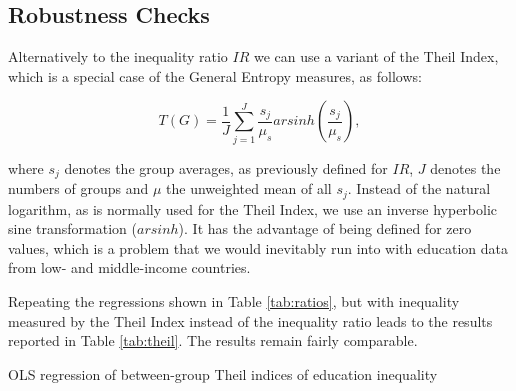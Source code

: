 \begin{appendices}
\clearpage

\hypertarget{robustness-checks-with-the-theil-index}{%
\section{Robustness Checks}\label{robustness-checks-with-the-theil-index}}
\setcounter{table}{0}
\renewcommand{\thetable}{\thesection\arabic{table}}

Alternatively to the inequality ratio \(IR\) we can use a variant of the Theil Index, which is a special case of the General Entropy measures, as follows:

\[
T(G) = \frac{1}{J}\sum_{j=1}^{J}\frac{s_j}{\mu_s}arsinh(\frac{s_j}{\mu_s}),
\]

where \(s_j\) denotes the group averages, as previously defined for \(IR\), \(J\) denotes the numbers of groups and \(\mu\) the unweighted mean of all \(s_j\). Instead of the natural logarithm, as is normally used for the Theil Index, we use an inverse hyperbolic sine transformation (\(arsinh\)). It has the advantage of being defined for zero values, which is a problem that we would inevitably run into with education data from low- and middle-income countries.

Repeating the regressions shown in Table \ref{tab:ratios}, but with inequality measured by the Theil Index instead of the inequality ratio leads to the results reported in Table \ref{tab:theil}. The results remain fairly comparable.

\begin{table}

\caption{OLS regression of between-group Theil indices of education inequality\label{tab:theil}}
\centering

\end{table}
\FloatBarrier

\end{appendices}

